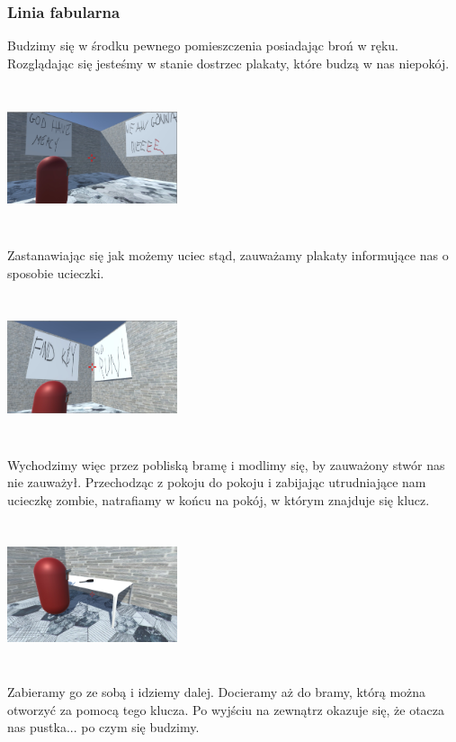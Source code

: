 \documentclass[12pt,a4paper]{article}
\newcommand{\si}{ś}
\begin{document}
	\subsubsection*{Linia fabularna}
	Budzimy się w \si rodku pewnego pomieszczenia posiadając broń w ręku. Rozglądając się jeste\si my w stanie dostrzec plakaty, które budzą w nas niepokój. \\
\includegraphics[height=5cm, width=5cm]{1.jpg}\\
Zastanawiając się jak możemy uciec stąd, zauważamy plakaty informujące nas o sposobie ucieczki. \\
\includegraphics[height=5cm, width=5cm]{2.jpg}\\
Wychodzimy więc przez pobliską bramę i modlimy się, by zauważony stwór nas nie zauważył. Przechodząc z pokoju do pokoju i zabijając utrudniające nam ucieczkę zombie, natrafiamy w końcu na pokój, w którym znajduje się klucz.  \\
\includegraphics[height=5cm, width=5cm]{3.jpg}\\
Zabieramy go ze sobą i idziemy dalej. Docieramy aż do bramy, którą można otworzyć za pomocą tego klucza. Po wyj\si ciu na zewnątrz okazuje się, że otacza nas pustka... po czym się budzimy.
\end{document}

